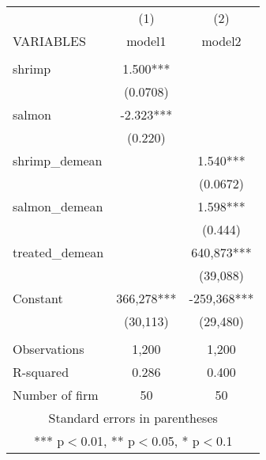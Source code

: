 \documentclass[]{article}
\begin{document}
\begin{tabular}{lcc} \hline
 & (1) & (2) \\
VARIABLES & model1 & model2 \\ \hline
 &  &  \\
shrimp & 1.500*** &  \\
 & (0.0708) &  \\
salmon & -2.323*** &  \\
 & (0.220) &  \\
shrimp\_demean &  & 1.540*** \\
 &  & (0.0672) \\
salmon\_demean &  & 1.598*** \\
 &  & (0.444) \\
treated\_demean &  & 640,873*** \\
 &  & (39,088) \\
Constant & 366,278*** & -259,368*** \\
 & (30,113) & (29,480) \\
 &  &  \\
Observations & 1,200 & 1,200 \\
R-squared & 0.286 & 0.400 \\
 Number of firm & 50 & 50 \\ \hline
\multicolumn{3}{c}{ Standard errors in parentheses} \\
\multicolumn{3}{c}{ *** p$<$0.01, ** p$<$0.05, * p$<$0.1} \\
\end{tabular}
\end{document}
